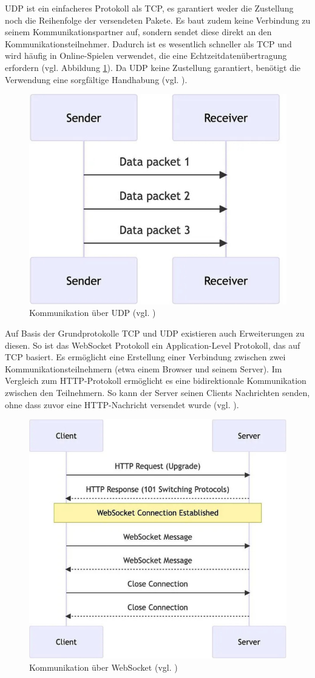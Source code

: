 \ac{UDP} ist ein einfacheres Protokoll als \ac{TCP}, es garantiert weder die Zustellung noch die Reihenfolge der versendeten Pakete. Es baut zudem keine Verbindung zu seinem Kommunikationspartner auf, sondern sendet diese direkt an den Kommunikationsteilnehmer. Dadurch ist es wesentlich schneller als \ac{TCP} und wird häufig in Online-Spielen verwendet, die eine Echtzeitdatenübertragung erfordern (vgl. Abbildung \ref{fig:udp}). Da \ac{UDP} keine Zustellung garantiert, benötigt die Verwendung eine sorgfältige Handhabung (vgl. \cite{mygames_unity_2024}).

\begin{figure}[ht]
\centering
\includegraphics[width=0.5\linewidth]{content/pictures/UDP-Network.png}
\caption{Kommunikation über UDP (vgl. \cite{mygames_unity_2024})}
\label{fig:udp}
\end{figure}

Auf Basis der Grundprotokolle \ac{TCP} und \ac{UDP} existieren auch Erweiterungen zu diesen. So ist das WebSocket Protokoll ein Application-Level Protokoll, das auf \ac{TCP} basiert. Es ermöglicht eine Erstellung einer Verbindung zwischen zwei Kommunikationsteilnehmern (etwa einem Browser und seinem Server). Im Vergleich zum \ac{HTTP}-Protokoll ermöglicht es eine bidirektionale Kommunikation zwischen den Teilnehmern. So kann der Server seinen Clients Nachrichten senden, ohne dass zuvor eine \ac{HTTP}-Nachricht versendet wurde (vgl. \cite{mygames_unity_2024}).

\begin{figure}[ht]
\centering
\includegraphics[width=0.5\linewidth]{content/pictures/WebSocket-Network.png}
\caption{Kommunikation über WebSocket (vgl. \cite{mygames_unity_2024})}
\label{fig:ws}
\end{figure}


